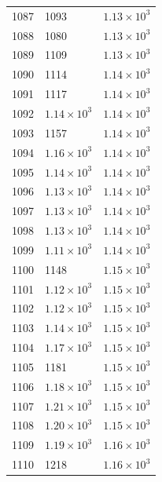 \begin{table}[H]
\begin{tabular}{lll}
1087 & 1093 & $\displaystyle 1.13 \times 10^{3}$ \\
1088 & 1080 & $\displaystyle 1.13 \times 10^{3}$ \\
1089 & 1109 & $\displaystyle 1.13 \times 10^{3}$ \\
1090 & 1114 & $\displaystyle 1.14 \times 10^{3}$ \\
1091 & 1117 & $\displaystyle 1.14 \times 10^{3}$ \\
1092 & $\displaystyle 1.14 \times 10^{3}$ & $\displaystyle 1.14 \times 10^{3}$ \\
1093 & 1157 & $\displaystyle 1.14 \times 10^{3}$ \\
1094 & $\displaystyle 1.16 \times 10^{3}$ & $\displaystyle 1.14 \times 10^{3}$ \\
1095 & $\displaystyle 1.14 \times 10^{3}$ & $\displaystyle 1.14 \times 10^{3}$ \\
1096 & $\displaystyle 1.13 \times 10^{3}$ & $\displaystyle 1.14 \times 10^{3}$ \\
1097 & $\displaystyle 1.13 \times 10^{3}$ & $\displaystyle 1.14 \times 10^{3}$ \\
1098 & $\displaystyle 1.13 \times 10^{3}$ & $\displaystyle 1.14 \times 10^{3}$ \\
1099 & $\displaystyle 1.11 \times 10^{3}$ & $\displaystyle 1.14 \times 10^{3}$ \\
1100 & 1148 & $\displaystyle 1.15 \times 10^{3}$ \\
1101 & $\displaystyle 1.12 \times 10^{3}$ & $\displaystyle 1.15 \times 10^{3}$ \\
1102 & $\displaystyle 1.12 \times 10^{3}$ & $\displaystyle 1.15 \times 10^{3}$ \\
1103 & $\displaystyle 1.14 \times 10^{3}$ & $\displaystyle 1.15 \times 10^{3}$ \\
1104 & $\displaystyle 1.17 \times 10^{3}$ & $\displaystyle 1.15 \times 10^{3}$ \\
1105 & 1181 & $\displaystyle 1.15 \times 10^{3}$ \\
1106 & $\displaystyle 1.18 \times 10^{3}$ & $\displaystyle 1.15 \times 10^{3}$ \\
1107 & $\displaystyle 1.21 \times 10^{3}$ & $\displaystyle 1.15 \times 10^{3}$ \\
1108 & $\displaystyle 1.20 \times 10^{3}$ & $\displaystyle 1.15 \times 10^{3}$ \\
1109 & $\displaystyle 1.19 \times 10^{3}$ & $\displaystyle 1.16 \times 10^{3}$ \\
1110 & 1218 & $\displaystyle 1.16 \times 10^{3}$ \\

\end{tabular}
\end{table}

